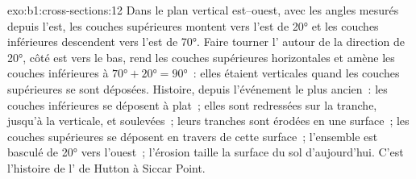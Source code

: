 \begin{solution}{exo:b1:cross-sections:12}
Dans le plan vertical est--ouest, avec les angles mesurés depuis l'est, les
couches supérieures montent vers l'est de \ang{20} et les couches inférieures
descendent vers l'est de \ang{70}. Faire tourner l' autour de la
direction de \ang{20}, côté est vers le bas, rend les couches supérieures
horizontales et amène les couches inférieures à $\ang{70} + \ang{20} = \ang{90}$~:
elles étaient verticales quand les couches supérieures se sont déposées.
Histoire, depuis l'événement le plus ancien~: les couches inférieures se déposent
à plat~; elles sont redressées sur la tranche, jusqu'à la verticale, et
soulevées~; leurs tranches sont érodées en une surface~; les couches supérieures
se déposent en travers de cette surface~; l'ensemble est basculé de \ang{20} vers
l'ouest~; l'érosion taille la surface du sol d'aujourd'hui. C'est l'histoire de
l' de Hutton à Siccar Point.
\end{solution}

